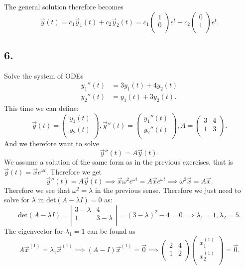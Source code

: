 The general solution therefore becomes
\[ 
\Vec{y}(t) = c_1 \Vec{y}_1(t) + c_2 \Vec{y}_2(t) = c_1 \begin{pmatrix}
1\\
0\\
\end{pmatrix} e^{t} + c_2 \begin{pmatrix}
0\\
1\\
\end{pmatrix} e^{t}
.\]

\subsection*{6.} Solve the system of ODEs
\begin{align*}
  y_1''(t) &= 3y_1(t) + 4y_2(t) \\
  y_2''(t) &= y_1(t) + 3y_2(t)
.\end{align*}
\bigbreak
This time we can define:
\[ 
\Vec{y}(t) = \begin{pmatrix}
y_1(t)\\
y_2(t)\\
\end{pmatrix}, \Vec{y}''(t) = \begin{pmatrix}
y_1''(t)\\
y_2''(t)\\
\end{pmatrix}, A = \begin{pmatrix}
3 & 4\\
1 & 3\\
\end{pmatrix}
.\]
And we therefore want to solve
\[ 
\Vec{y}''(t) = A \Vec{y}(t)
.\]
We assume a solution of the same form as in the previous exercises, that is $\Vec{y}(t) = \Vec{x} e^{\omega t}$. Therefore we get
\[ 
\Vec{y}''(t) = A \Vec{y}(t) \implies \Vec{x} \omega^2 e^{\omega t} = A \Vec{x} e^{\omega t}\implies \omega^2 \Vec{x} = A \Vec{x}
.\]
Therefore we see that $\omega^2 = \lambda$ in the previous sense. Therefore we just need to solve for $\lambda$ in $\mathrm{det}(A-\lambda I ) = 0$ as:
\[ 
\mathrm{det}(A - \lambda I) = \left| \begin{array}{cc}
3-\lambda & 4\\
1 & 3-\lambda\\
\end{array} \right| = (3 - \lambda)^2 - 4 = 0 \implies \lambda_1 = 1, \lambda_2 = 5
.\]
The eigenvector for $\lambda_1 = 1$ can be found as
\[ 
A \Vec{x}^{(1)} = \lambda_1 \Vec{x}^{(1)} \implies (A - I)\Vec{x}^{(1)} = \Vec{0} \implies \begin{pmatrix}
2 & 4\\
1 & 2\\
\end{pmatrix} \begin{pmatrix}
x_1^{(1)}\\
x_2^{(1)}\\
\end{pmatrix} = \Vec{0}
.\]
